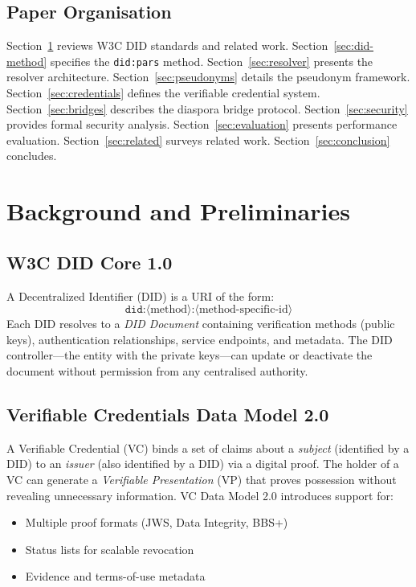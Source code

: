 \documentclass[11pt,a4paper]{article}
\begin{document}
\subsection{Paper Organisation}

Section~\ref{sec:background} reviews W3C DID standards and related work.
Section~\ref{sec:did-method} specifies the \texttt{did:pars} method.
Section~\ref{sec:resolver} presents the resolver architecture.
Section~\ref{sec:pseudonyms} details the pseudonym framework.
Section~\ref{sec:credentials} defines the verifiable credential system.
Section~\ref{sec:bridges} describes the diaspora bridge protocol.
Section~\ref{sec:security} provides formal security analysis.
Section~\ref{sec:evaluation} presents performance evaluation.
Section~\ref{sec:related} surveys related work.
Section~\ref{sec:conclusion} concludes.

\section{Background and Preliminaries}
\label{sec:background}

\subsection{W3C DID Core 1.0}

A Decentralized Identifier (DID) \cite{w3c-did-core} is a URI of the form:
\[
    \texttt{did:}\langle\text{method}\rangle\texttt{:}\langle\text{method-specific-id}\rangle
\]
Each DID resolves to a \emph{DID Document} containing verification methods (public
keys), authentication relationships, service endpoints, and metadata. The DID
controller---the entity with the private keys---can update or deactivate the document
without permission from any centralised authority.

\subsection{Verifiable Credentials Data Model 2.0}

A Verifiable Credential (VC) \cite{w3c-vc-dm} binds a set of claims about a
\emph{subject} (identified by a DID) to an \emph{issuer} (also identified by a DID)
via a digital proof. The holder of a VC can generate a \emph{Verifiable Presentation}
(VP) that proves possession without revealing unnecessary information. VC Data Model
2.0 introduces support for:

\begin{itemize}
    \item Multiple proof formats (JWS, Data Integrity, BBS+)
    \item Status lists for scalable revocation
    \item Evidence and terms-of-use metadata
\end{itemize}
\end{document}
